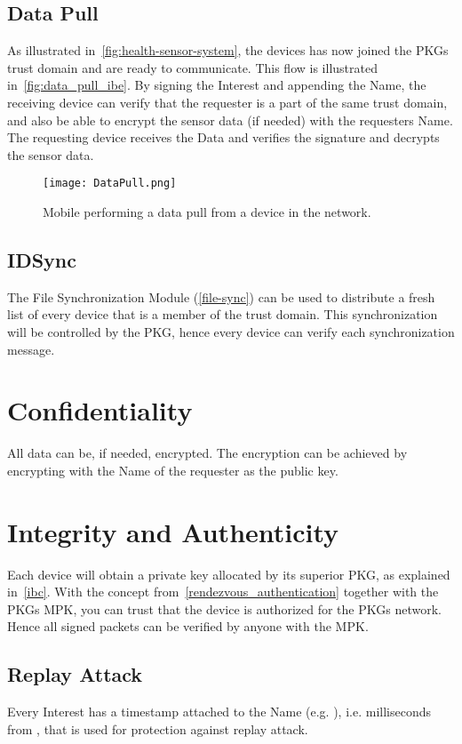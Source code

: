 \subsection{Data Pull}
As illustrated in~\autoref{fig:health-sensor-system}, the devices has now joined the \gls{PKG}s trust domain and are ready to communicate.
This flow is illustrated in~\autoref{fig:data_pull_ibe}.
By signing the Interest and appending the Name, the receiving device can verify that the requester is a part of the same trust domain, and also be able to encrypt the sensor data (if needed) with the requesters Name.
The requesting device receives the Data and verifies the signature and decrypts the sensor data.

\begin{figure}[ht]
  \centering
  \texttt{[image: DataPull.png]}
  \caption{Mobile performing a data pull from a device in the network.}
  \label{fig:data_pull_ibe}
\end{figure}

\subsection{IDSync}
The File Synchronization Module (\autoref{file-sync}) can be used to distribute a fresh list of every device that is a member of the trust domain.
This synchronization will be controlled by the \gls{PKG}, hence every device can verify each synchronization message.

\section{Confidentiality}

All data can be, if needed, encrypted.
The encryption can be achieved by encrypting with the Name of the requester as the public key.


\section{Integrity and Authenticity}

Each device will obtain a private key allocated by its superior \gls{PKG}, as explained in~\autoref{ibc}.
With the concept from~\autoref{rendezvous_authentication} together with the \gls{PKG}s \gls{MPK}, you can trust that the device is authorized for the \gls{PKG}s network. Hence all signed packets can be verified by anyone with the \gls{MPK}.

\subsection{Replay Attack}
Every Interest has a timestamp attached to the Name (e.g. ), i.e. milliseconds from , that is used for protection against replay attack. 


